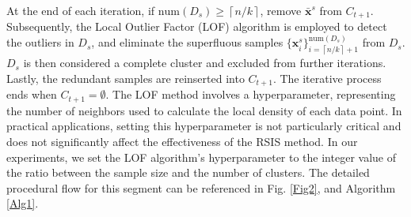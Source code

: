\documentclass[final,3p,times]{elsarticle}
\begin{document}
At the end of each iteration, if $\text{num}(D_s){\ge}\left\lceil 
n/k\right\rceil$, remove $\bar{\boldsymbol{x}}^s$ from $C_{t+1}$. 
Subsequently, the Local Outlier Factor (LOF) algorithm \cite{bib53} is 
employed to detect the outliers in $D_s$, and eliminate the 
superfluous samples $\{\boldsymbol{x}^s_i\}_{i=\left\lceil n/k
\right\rceil+1}^{\text{num}(D_s)}$ from $D_s$. $D_s$ is then 
considered a complete cluster and excluded from further iterations.
 Lastly, the redundant samples are 
 reinserted into $C_{t+1}$. The iterative process ends when 
$C_{t+1}=\emptyset$. {\color{myred}The LOF method involves a hyperparameter, 
representing the number of neighbors used to calculate the 
local density of each data point. In practical applications, 
setting this hyperparameter is not particularly critical and 
does not significantly affect the effectiveness of the RSIS 
method. In our experiments, we set the LOF algorithm’s hyperparameter 
to the integer value of the ratio between the sample size and the number of clusters.}
The detailed procedural flow for this 
 segment can be referenced in Fig. \ref{Fig2}, and Algorithm \ref{Alg1}.
\end{document}
